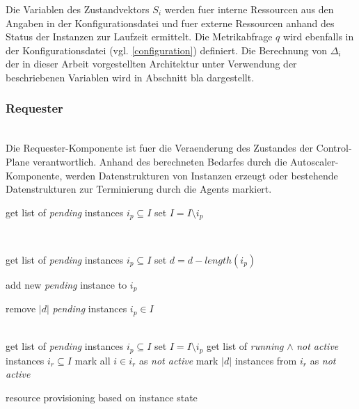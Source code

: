 \documentclass[runningheads]{llncs}
\begin{document}
Die Variablen des Zustandvektors $S_{i}$ werden fuer interne Ressourcen aus den Angaben in der Konfigurationsdatei und fuer externe Ressourcen anhand des Status der Instanzen zur Laufzeit ermittelt. Die Metrikabfrage $q$ wird ebenfalls in der Konfigurationsdatei (vgl. \ref{configuration}) definiert. Die Berechnung von $\Delta _{i}$ der in dieser Arbeit vorgestellten Architektur unter Verwendung der beschriebenen Variablen wird in Abschnitt bla dargestellt. 
	
\subsubsection{Requester}  \hfill\\

Die Requester-Komponente ist fuer die Veraenderung des Zustandes der Control-Plane verantwortlich. Anhand des berechneten Bedarfes durch die Autoscaler-Komponente, werden Datenstrukturen von Instanzen erzeugt oder bestehende Datenstrukturen zur Terminierung durch die Agents markiert.

\begin{algorithm}[H]
	\DontPrintSemicolon
	{
		get list of \textit{pending} instances $i_{p} \subseteq I$ \;
		set $I = I \setminus i_{p}$ \;
	}
	
	\texttt{\\}
	{
		get list of \textit{pending} instances $i_{p} \subseteq I$ \;
		set $d = d - length(i_{p})$ \;
		
		{
			
			{
				add new \textit{pending} instance to  $i_{p}$
			}
			
		}
	
		{
			remove $|d|$ \textit{pending} instances $i_{p} \in I$
		}
	}
	
	\texttt{\\}
	{
		get list of \textit{pending} instances $i_{p} \subseteq I$ \;
		set $I = I \setminus i_{p}$ \;
		get list of \textit{running} $\wedge$ \textit{not active} instances $i_{r} \subseteq I$ \;
		{
			mark all $i \in i_{r}$ as \textit{not active}
		}
		\Else 
		{
			mark $|d|$ instances from $i_{r}$ as \textit{not active}
		}
	}
	
	\caption{resource provisioning based on instance state}
\end{algorithm}
\end{document}

